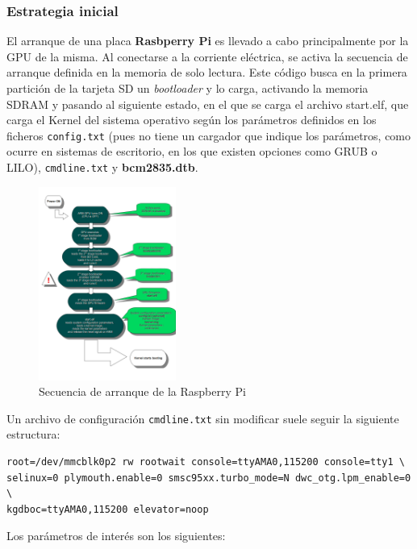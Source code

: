 \documentclass{article}
\begin{document}
\subsubsection{Estrategia inicial}

El arranque de una placa \textbf{Rasbperry Pi} es llevado a cabo principalmente por la GPU de la misma. Al conectarse a la corriente eléctrica, se activa la secuencia de arranque definida en la memoria de solo lectura. Este código busca en la primera partición de la tarjeta SD un \textit{bootloader} y lo carga, activando la memoria SDRAM y pasando al siguiente estado, en el que se carga el archivo start.elf, que carga el Kernel del sistema operativo según los parámetros definidos en los ficheros \texttt{config.txt} (pues no tiene un cargador que indique los parámetros, como ocurre en sistemas de escritorio, en los que existen opciones como GRUB o LILO), \texttt{cmdline.txt} y \textbf{bcm2835.dtb}.

\begin{figure}[H]
	\centering
	\includegraphics[width=0.4\textwidth]{bootsequence}
	\caption{Secuencia de arranque de la Raspberry Pi\cite{bootsequence}}
	\label{bootsequence}
\end{figure}

Un archivo de configuración \texttt{cmdline.txt} sin modificar suele seguir la siguiente estructura:

\begin{lstlisting}[frame=single,basicstyle=\small\ttfamily]
root=/dev/mmcblk0p2 rw rootwait console=ttyAMA0,115200 console=tty1 \
selinux=0 plymouth.enable=0 smsc95xx.turbo_mode=N dwc_otg.lpm_enable=0 \
kgdboc=ttyAMA0,115200 elevator=noop
\end{lstlisting}

Los parámetros de interés son los siguientes:
\end{document}
